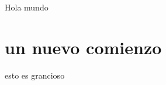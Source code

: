 \documentclass{article}
\begin{document}
Hola mundo

\section{un nuevo comienzo}

esto es grancioso
\end{document}
